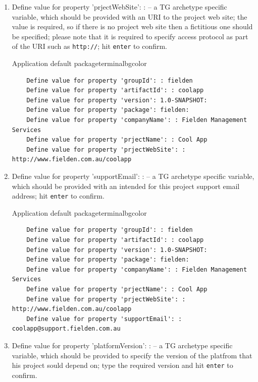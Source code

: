 \begin{enumerate}
    \item Define value for property 'prjectWebSite': : -- a TG archetype specific variable, which should be provided with an URI to the project web site; the value is required, so if there is no project web site then a fictitious one should be specified; please note that it is required to specify access protocol as part of the URI such as \texttt{http://}; hit \texttt{enter} to confirm.
    
    \begin{code}{Application default package}{\label{lst::archetype-package}}{terminalbgcolor}
      \begin{lstlisting}
	Define value for property 'groupId': : fielden		
	Define value for property 'artifactId': : coolapp
	Define value for property 'version': 1.0-SNAPSHOT:
	Define value for property 'package': fielden:	
	Define value for property 'companyName': : Fielden Management Services
	Define value for property 'prjectName': : Cool App
	Define value for property 'prjectWebSite': : http://www.fielden.com.au/coolapp
      \end{lstlisting}
    \end{code}

    \item Define value for property 'supportEmail': : -- a TG archetype specific variable, which should be provided with an intended for this project support email address; hit \texttt{enter} to confirm.
    
    \begin{code}{Application default package}{\label{lst::archetype-package}}{terminalbgcolor}
      \begin{lstlisting}
	Define value for property 'groupId': : fielden		
	Define value for property 'artifactId': : coolapp
	Define value for property 'version': 1.0-SNAPSHOT:
	Define value for property 'package': fielden:	
	Define value for property 'companyName': : Fielden Management Services
	Define value for property 'prjectName': : Cool App
	Define value for property 'prjectWebSite': : http://www.fielden.com.au/coolapp
	Define value for property 'supportEmail': : coolapp@support.fielden.com.au
      \end{lstlisting}
    \end{code}

    \item Define value for property 'platformVersion': : -- a TG archetype specific variable, which should be provided to specify the version of the platfrom that his project sould depend on; type the required version and hit \texttt{enter} to confirm.
    

\end{enumerate}
